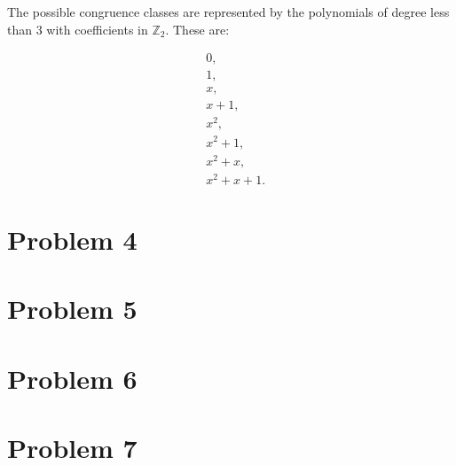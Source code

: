 \documentclass{article}
\begin{document}
The possible congruence classes are represented by the polynomials of degree less than 3 with coefficients in \(\mathbb{Z}_2\). These are:

\[
\begin{aligned}
    &0, \\
    &1, \\
    &x, \\
    &x+1, \\
    &x^2, \\
    &x^2+1, \\
    &x^2+x, \\
    &x^2+x+1.
\end{aligned}
\]

\section{Problem 4}

\section{Problem 5}

\section{Problem 6}

\section{Problem 7}
\end{document}
